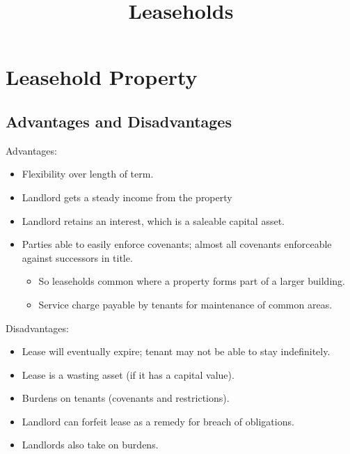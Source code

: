 \documentclass[
]{article}
\title{Leaseholds}
\author{}
\date{}
\providecommand{\tightlist}{%
  \setlength{\itemsep}{0pt}\setlength{\parskip}{0pt}}
\begin{document}
\maketitle

{
\setcounter{tocdepth}{3}
\tableofcontents
}
\hypertarget{leasehold-property}{%
\section{Leasehold Property}\label{leasehold-property}}

\hypertarget{advantages-and-disadvantages}{%
\subsection{Advantages and
Disadvantages}\label{advantages-and-disadvantages}}

Advantages:

\begin{itemize}
\tightlist
\item
  Flexibility over length of term.
\item
  Landlord gets a steady income from the property
\item
  Landlord retains an interest, which is a saleable capital asset.
\item
  Parties able to easily enforce covenants; almost all covenants
  enforceable against successors in title.

  \begin{itemize}
  \tightlist
  \item
    So leaseholds common where a property forms part of a larger
    building.
  \item
    Service charge payable by tenants for maintenance of common areas.
  \end{itemize}
\end{itemize}

Disadvantages:

\begin{itemize}
\tightlist
\item
  Lease will eventually expire; tenant may not be able to stay
  indefinitely.
\item
  Lease is a wasting asset (if it has a capital value).
\item
  Burdens on tenants (covenants and restrictions).
\item
  Landlord can forfeit lease as a remedy for breach of obligations.
\item
  Landlords also take on burdens.
\end{itemize}
\end{document}

